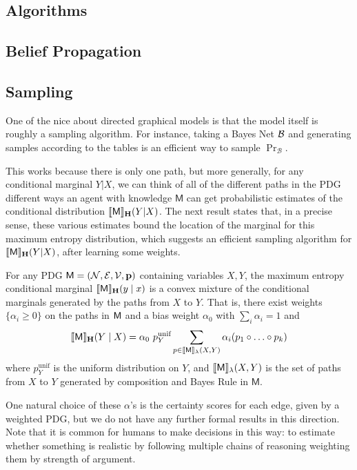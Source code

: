 \documentclass{article}
\newcommand\MaxEnt{_{\mathbf H}}
\newcommand{\sfM}{\mathsf M}
\newcommand{\MN}{PDG}
\numberwithin{equation}{section}
\begin{document}
	\begin{vfull}
	\section{Algorithms}\label{sec:algorithms}
	\subsection{Belief Propagation}
	
	
	\subsection{Sampling}
	
	One of the nice about directed graphical models is that the model itself is roughly a sampling algorithm. For instance, taking a Bayes Net $\cal B$ and generating samples according to the tables is an efficient way to sample $\Pr_{\mathcal B}$.

	This works because there is only one path, but more generally, for any conditional marginal $Y|X$, we can think of all of the different paths in the PDG different ways an agent with knowledge $\sfM$ can get probabilistic estimates of the conditional distribution $\bbr{\sfM}\MaxEnt(Y | X)$. The next result states that, in a precise sense, these various estimates bound the location of the marginal for this maximum entropy distribution, which suggests an efficient sampling algorithm for $\bbr{\sfM}\MaxEnt(Y | X)$, after learning some weights.
	
	\begin{conj}\label{thm:maxent-hull}
		For any PDG $\sfM = \mnvars[]$ containing variables $X, Y$, the maximum entropy conditional marginal $\bbr{\sfM}\MaxEnt(y \mid x)$ is a convex mixture of the conditional marginals generated by the paths from $X$ to $Y$.  That is, there exist weights $\{\alpha_i \geq 0\}$ on the paths in $\sf M$ and a bias weight $\alpha_0$ with $\sum_i {\alpha_i} = 1$ and
		\[ \bbr{\sfM}\MaxEnt(Y \mid X) = \alpha_0 \  p^{\text{unif}}_Y \sum_{p \in \bbr{\sfM}_\lambda(X, Y)} \alpha_i (p_1 \circ \ldots \circ p_k) \]
		where $p^{\text{unif}}_Y$ is the uniform distribution on $Y$, and $\bbr{\sfM}_\lambda(X,Y)$ is the set of paths from $X$ to $Y$ generated by composition and Bayes Rule in $\sfM$. 
	\end{conj}

	One natural choice of these $\alpha$'s is the certainty scores for each edge, given by a weighted \MN, but we do not have any further formal results in this direction.
	Note that it is common for humans to make decisions in this way: to estimate whether something is realistic by following multiple chains of reasoning weighting them by strength of argument.
	
	\end{vfull}
\end{document}
